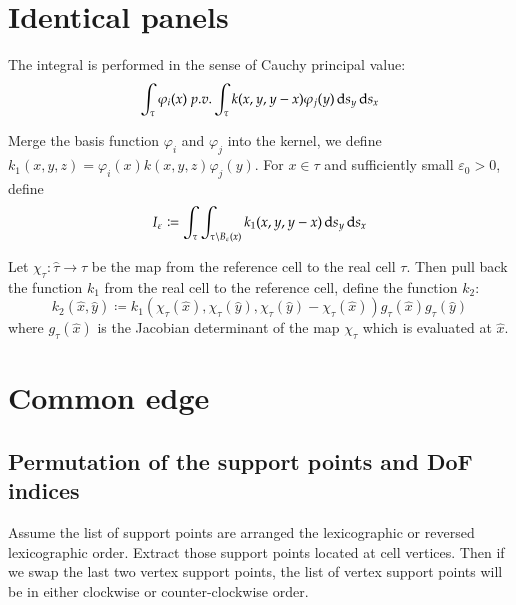 \documentclass[11pt, a4paper]{book}
\begin{document}
\section{Identical panels}

The integral is performed in the sense of Cauchy principal value:
\begin{equation}
  \int_{\tau} \varphi_i(x) \; p.v.\int_{\tau}k(x,y,y-x) \varphi_j(y) \,\mathrm{d} s_y \,\mathrm{d} s_x
\end{equation}

Merge the basis function $\varphi_i$ and $\varphi_j$ into the kernel, we define
$k_1(x,y,z)=\varphi_i(x)k(x,y,z)\varphi_j(y)$. For $x\in\tau$ and sufficiently small
$\varepsilon_0>0$, define
\begin{equation}
  I_{\varepsilon}\coloneqq \int_{\tau}\int_{\tau\backslash B_{\varepsilon}(x)} k_1(x,y,y-x) \,\mathrm{d}
  s_y \,\mathrm{d} s_x
\end{equation}

Let $\chi_{\tau}: \hat{\tau} \rightarrow \tau$ be the map from the reference cell to the real cell
$\tau$. Then pull back the function $k_1$ from the real cell to the reference cell, define the
function $k_2$:
\begin{equation}
  k_2(\hat{x}, \hat{y}) \coloneqq k_1(\chi_{\tau}(\hat{x}), \chi_{\tau}(\hat{y}), \chi_{\tau}(\hat{y})
  - \chi_{\tau}(\hat{x})) g_{\tau}(\hat{x}) g_{\tau}(\hat{y})
\end{equation}
where $g_{\tau}(\hat{x})$ is the Jacobian determinant of the map $\chi_{\tau}$ which is evaluated at
$\hat{x}$.

\section{Common edge}

\subsection{Permutation of the support points and DoF indices}


Assume the list of support points are arranged the lexicographic or reversed lexicographic order.
Extract those support points located at cell vertices. Then if we swap the last two vertex support
points, the list of vertex support points will be in either clockwise or counter-clockwise order.

\end{document}
